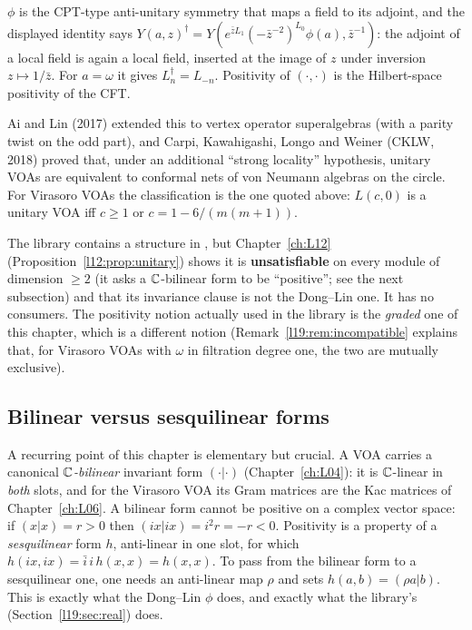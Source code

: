 \begin{physics}
$\phi$ is the CPT-type anti-unitary symmetry that maps a field to its adjoint, and the displayed
identity says $Y(a,z)^\dagger = Y(e^{\bar zL_1}(-\bar z^{-2})^{L_0}\phi(a),\bar z^{-1})$: the
adjoint of a local field is again a local field, inserted at the image of $z$ under inversion
$z\mapsto 1/\bar z$. For $a=\omega$ it gives $L_n^\dagger = L_{-n}$. Positivity of $(\cdot,\cdot)$ is
the Hilbert-space positivity of the CFT.
\end{physics}

Ai and Lin (2017) extended this to vertex operator superalgebras (with a parity twist on the odd
part), and Carpi, Kawahigashi, Longo and Weiner (CKLW, 2018) proved that, under an additional
``strong locality'' hypothesis, unitary VOAs are equivalent to conformal nets of von Neumann
algebras on the circle. For Virasoro VOAs the classification is the one quoted above:
$L(c,0)$ is a unitary VOA iff $c\ge1$ or $c = 1-6/(m(m+1))$.

\begin{warning}[title={The library has no Dong--Lin unitarity}]\label{l19:warn:nodonglin}
The library contains a structure  in ,
but Chapter~\ref{ch:L12} (Proposition~\ref{l12:prop:unitary}) shows it is \textbf{unsatisfiable} on every
module of dimension $\ge2$ (it asks a ${\mathbb{C}}$-bilinear form to be ``positive''; see the next
subsection) and that its invariance clause is not the Dong--Lin one. It has no consumers. The
positivity notion actually used in the library is the \emph{graded} one of this chapter, which is a
different notion (Remark~\ref{l19:rem:incompatible} explains that, for Virasoro VOAs with
$\omega$ in filtration degree one, the two are mutually exclusive).
\end{warning}

\subsection{Bilinear versus sesquilinear forms}

A recurring point of this chapter is elementary but crucial. A VOA carries a canonical
\emph{${\mathbb{C}}$-bilinear} invariant form $(\cdot|\cdot)$ (Chapter~\ref{ch:L04}): it is
${\mathbb{C}}$-linear in \emph{both} slots, and for the Virasoro VOA its Gram matrices are the Kac matrices of
Chapter~\ref{ch:L06}. A bilinear form cannot be positive on a complex vector space: if
$(x|x) = r>0$ then $(ix|ix) = i^2r = -r<0$. Positivity is a property of a \emph{sesquilinear}
form $h$, anti-linear in one slot, for which $h(ix,ix) = \bar i\,i\,h(x,x) = h(x,x)$. To pass from
the bilinear form to a sesquilinear one, one needs an anti-linear map $\rho$ and sets
$h(a,b) = (\rho a|b)$. This is exactly what the Dong--Lin $\phi$ does, and exactly what the
library's  (Section~\ref{l19:sec:real}) does.

